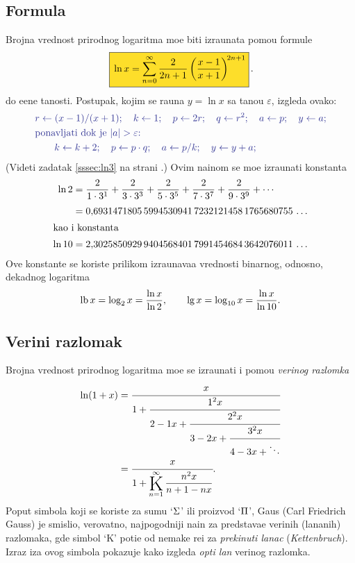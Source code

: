 \documentclass[12pt, twoside, a4paper]{article}
\def\K{\mathop{\vcenter{\hbox{\rm\huge K}}}\limits}
\def\n{n}
\def\Ki{\K_{\n=1}}
\def\Kinf#1#2{\Ki^\infty\displaystyle{\frac{#1}{#2}}}
\def\logten{\log_{10}}
\def\logtwo{\log_2}
\def\.{{,}}
\def\okvir#1{\,\fcolorbox{black}{Goldenrod}{$\displaystyle{\mathstrut #1}$}\,}
\begin{document}
\subsection{Formula}

Brojna vrednost prirodnog logaritma mo{\zv}e biti izra{\cv}unata pomo{\cc}u formule
\begin{equation}
\okvir{
\ln x
=\sum_{n=0}^\infty\frac{2}{2n+1}\left(\frac{x-1}{x+1}\right)^{\!2n+1}
}.
\label{eq:lnred}
\end{equation}
do {\zv}e{\lj}ene ta{\cv}nosti.
Postupak, kojim se ra{\cv}una $y=\ln x$ sa ta{\cv}no{\sv}{\cc}u $\varepsilon$,
izgleda ovako:
\def\asg{\leftarrow}%
\begin{equation}
\label{eq:alg}
\begingroup\color{Blue}
\begin{aligned}
&r\asg(x-1)/(x+1);\quad k\asg 1;\quad p\asg 2r;\quad q\asg r^2;\quad a\asg p;\quad y\asg a;\\
&\text{ponav{\lj}ati dok je $|a|>\varepsilon$:}\\
&\qquad k\asg k+2;\quad p\asg p\cdot q;\quad a\asg p/k;\quad y\asg y+a;
\end{aligned}
\endgroup
\end{equation}
(Videti zadatak \ref{sssec:ln3} na strani \pageref{sssec:ln3}.)
Ovim na{\cv}inom se mo{\zv}e izra{\cv}unati konstanta
\begin{align*}
\ln2
&=\frac{2}{1\cdot3^1}+\frac{2}{3\cdot3^3}+\frac{2}{5\cdot3^5}+\frac{2}{7\cdot3^7}+\frac{2}{9\cdot3^9}+\cdots\\
\noalign{\smallskip}
&= 0\.
6931471805\,
5994530941\,
7232121458\,
1765680755\,
\ldots\\
\intertext{kao i konstanta}
\ln 10&=2\.
3025850929\,
9404568401\,
7991454684\,
3642076011\,
\ldots
\end{align*}
Ove konstante se koriste prilikom izra{\cv}unava{\nj}a vrednosti binarnog, odnosno, dekadnog logaritma
$$
\lb x=\logtwo x={\ln x\over \ln2},\qquad \lg x=\logten x={\ln x\over \ln 10}.
$$

\subsection{Veri{\zv}ni razlomak}

Brojna vrednost prirodnog logaritma mo{\zv}e se izra{\cv}unati i pomo{\cc}u {\sl veri{\zv}nog razlomka}
\begin{align*}
\ln(1+x)
&=\cfrac{x}{1+\cfrac{1^2x}{2-1x+\cfrac{2^2x}{3-2x+\cfrac{3^2x}{4-3x+\ddots}}}}\\
\noalign{\vskip-3pt}
&=\cfrac{x}{1+ \Kinf{\n^2x}{\n+1-\n x}}.
\end{align*}
Poput simbola koji se koriste za sumu `$\rm\Sigma$' ili proizvod `$\rm\Pi$', 
Gaus (Carl Friedrich Gauss) je smislio, verovatno, najpogodniji na{\cv}in za predstav{\lj}a{\nj}e
veri{\zv}nih (lan{\cv}anih) razlomaka,
gde simbol `K' poti{\cv}e od nema{\cv}ke re{\cv}i za {\sl prekinuti lanac\/} ({\sl Kettenbruch\/}). 
Izraz iza ovog simbola pokazuje kako izgleda {\sl op{\sv}ti {\cv}lan\/} veri{\zv}nog razlomka.
\end{document}
